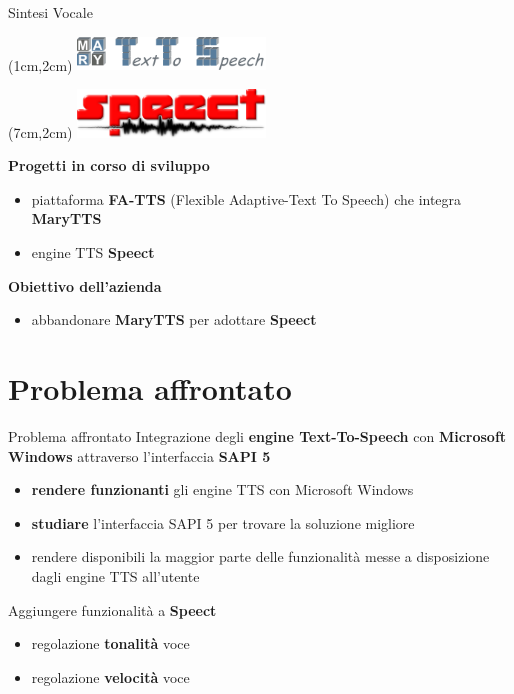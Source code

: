 \documentclass{beamer}
\begin{document}
	\begin{frame}{Sintesi Vocale}
		\begin{textblock*}{5cm}(1cm,2cm) %
			\includegraphics[width=5cm]{images/marylogo}
		\end{textblock*}
		\begin{textblock*}{5cm}(7cm,2cm) %
			\includegraphics[width=5cm]{images/speect_logo_full}
		\end{textblock*}
	    \vspace{50pt}
		\textbf{Progetti in corso di sviluppo}
		\begin{itemize}
			\item piattaforma \textbf{FA-TTS} (Flexible Adaptive-Text To Speech) che integra \textbf{MaryTTS}
			\item engine TTS \textbf{Speect}
		\end{itemize}
		\vspace{10pt}
		\textbf{Obiettivo dell'azienda}
		\begin{itemize}
			\item abbandonare \textbf{MaryTTS} per adottare \textbf{Speect} 
		\end{itemize}
	\end{frame}


	\section{Problema affrontato}

	\begin{frame}{Problema affrontato}
		Integrazione degli \textbf{engine Text-To-Speech} con \textbf{Microsoft Windows} attraverso l'interfaccia \textbf{SAPI 5}
		\begin{itemize}
		\item \textbf{rendere funzionanti} gli engine TTS con Microsoft Windows
		\item \textbf{studiare} l'interfaccia SAPI 5 per trovare la soluzione migliore
		\item rendere disponibili la maggior parte delle funzionalità messe a disposizione dagli engine TTS all'utente
		\end{itemize}
		\vspace{10pt}
		Aggiungere funzionalità a \textbf{Speect}
		\begin{itemize}
			\item regolazione \textbf{tonalità} voce
			\item regolazione \textbf{velocità} voce
		\end{itemize}
	\end{frame}
\end{document}
